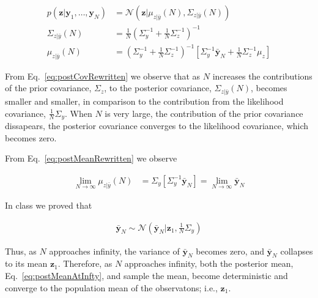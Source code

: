 \documentclass[12pt]{article}
\begin{document}
\begin{align}
    p(\mathbf{z}|\mathbf{y}_1,\ldots,\mathbf{y}_N)&=\mathcal{N}(\mathbf{z}|\mu_{z|\bar{y}}(N),\Sigma_{z|\bar{y}}(N))\nonumber\\
    \Sigma_{z|\bar{y}}(N)&=\frac{1}{N}\left(\Sigma_y^{-1}+\frac{1}{N}\Sigma_z^{-1}\right)^{-1}\label{eq:postCovRewritten}\\
    \mu_{z|\bar{y}}(N)&=\left(\Sigma_y^{-1}+\frac{1}{N}\Sigma_z^{-1}\right)^{-1}\left[\Sigma_y^{-1}\bar{\mathbf{y}}_N+\frac{1}{N}\Sigma_z^{-1}\mu_z\right]\label{eq:postMeanRewritten}
\end{align}

From Eq.~\ref{eq:postCovRewritten} we observe that as $N$ increases the
contributions of the prior covariance, $\Sigma_z$, to the posterior covariance,
$\Sigma_{z|\bar{y}}(N)$, becomes smaller and smaller, in comparison to the
contribution from the likelihood covariance, $\frac{1}{N}\Sigma_y$. When $N$ is
very large, the contribution of the prior covariance dissapears, the posterior
covariance converges to the likelihood covariance, which becomes zero.

From Eq.~\ref{eq:postMeanRewritten} we observe 

\begin{align}
    \lim_{N\rightarrow\infty}\mu_{z|\bar{y}}(N)&=\Sigma_y\left[\Sigma_y^{-1}\bar{\mathbf{y}}_N\right]=\lim_{N\rightarrow\infty}\bar{\mathbf{y}}_N\label{eq:postMeanAtInfty}
\end{align}

In class we proved that

\begin{align}
    \bar{\mathbf{y}}_N\sim\mathcal{N}(\bar{\mathbf{y}}_N|\mathbf{z}_1,\frac{1}{N}\Sigma_y)\nonumber
\end{align}

\noindent Thus, as $N$ approaches infinity, the variance of $\bar{\mathbf{y}}_N$
becomes zero, and $\bar{\mathbf{y}}_N$ collapses to its mean $\mathbf{z}_1$.
Therefore, as $N$ approaches infinity, both the posterior mean,
Eq.~\ref{eq:postMeanAtInfty}, and sample the mean, become deterministic and
converge to the population mean of the observatons; i.e., $\mathbf{z}_1$.



\end{document}
